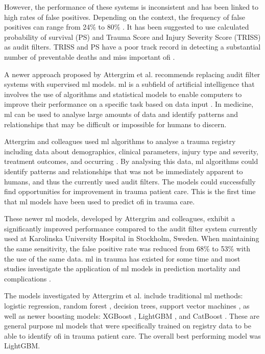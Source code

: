 \documentclass[12pt, a4paper]{article}
\begin{document}
However, the performance of these systems is inconsistent and has been linked to high rates of false positives. Depending on the context, the frequency of false positives can range from 24\% to 80\% \cite{attergrim_predicting_2023,sanddal_analysis_2011,roy_learning_2017,ghorbani_analysis_2018}. It has been suggested to use calculated probability of survival (PS) and Trauma Score and Injury Severity Score (TRISS) as audit filters. TRISS and PS have a poor track record in detecting a substantial number of preventable deaths and miss important \acrshort{ofi} \cite{heim_survival_2016}.

A newer approach proposed by Attergrim et al. \cite{attergrim_predicting_2023} recommends replacing audit filter systems with supervised \acrfull{ml} models. \acrshort{ml} is a subfield of artificial intelligence that involves the use of algorithms and statistical models to enable computers to improve their performance on a specific task based on data input \cite{}. In medicine, \acrshort{ml} can be used to analyse large amounts of data and identify patterns and relationships that may be difficult or impossible for humans to discern.

Attergrim and colleagues used \acrshort{ml} algorithms to analyse a trauma registry including data about demographics, clinical parameters, injury type and severity, treatment outcomes, and occurring . By analysing this data, \acrshort{ml} algorithms could identify patterns and relationships that was not be immediately apparent to humans, and thus the currently used audit filters. The models could successfully find opportunities for improvement in trauma patient care. This is the first time that \acrshort{ml} models have been used to predict \acrshort{ofi} in trauma care. \cite{attergrim_predicting_2023}

These newer \acrshort{ml} models, developed by Attergrim and colleagues, exhibit a significantly improved performance compared to the audit filter system currently used at Karolinska University Hospital in Stockholm, Sweden. When maintaining the same sensitivity, the false positive rate was reduced from 68\% to 53\% with the use of the same data. \acrshort{ml} in trauma has existed for some time and most studies investigate the application of \acrshort{ml} models in prediction mortality and complications \cite{zhang_machine_2022}.

The models investigated by Attergrim et al. include traditional \acrshort{ml} methods: logistic regression, random forest \cite{breiman_random_2001}, decision trees, support vector machines \cite{cortes_support-vector_1995}, as well as newer boosting models: XGBoost \cite{chen_xgboost_2016}, LightGBM \cite{ke_lightgbm_2017}, and CatBoost \cite{prokhorenkova_catboost_2018}. These are general purpose \acrshort{ml} models that were specifically trained on registry data to be able to identify \acrshort{ofi} in trauma patient care. The overall best performing model was LightGBM.
\end{document}
